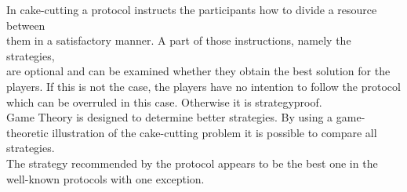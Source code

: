 In cake-cutting a protocol instructs the participants how to divide a resource between\\them in a satisfactory manner. A part of those instructions, namely the strategies,\\are optional and can be examined whether they obtain the best solution for the players. If this is not the case, the players have no intention to follow the protocol which can be overruled in this case. Otherwise it is strategyproof.\\Game Theory is designed to determine better strategies. By using a game-theoretic illustration of the cake-cutting problem it is possible to compare all strategies.\\The strategy recommended by the protocol appears to be the best one in the well-known protocols with one exception.  



